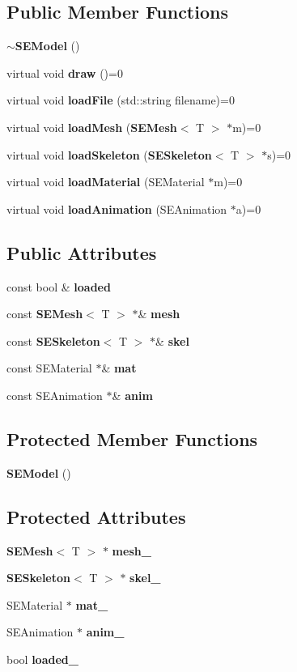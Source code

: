\subsection*{Public Member Functions}
\begin{DoxyCompactItemize}
\item 
{\bf $\sim$\+S\+E\+Model} ()
\item 
virtual void {\bf draw} ()=0
\item 
virtual void {\bf load\+File} (std\+::string filename)=0
\item 
virtual void {\bf load\+Mesh} ({\bf S\+E\+Mesh}$<$ T $>$ $\ast$m)=0
\item 
virtual void {\bf load\+Skeleton} ({\bf S\+E\+Skeleton}$<$ T $>$ $\ast$s)=0
\item 
virtual void {\bf load\+Material} (S\+E\+Material $\ast$m)=0
\item 
virtual void {\bf load\+Animation} (S\+E\+Animation $\ast$a)=0
\end{DoxyCompactItemize}
\subsection*{Public Attributes}
\begin{DoxyCompactItemize}
\item 
const bool \& {\bf loaded}
\item 
const {\bf S\+E\+Mesh}$<$ T $>$ $\ast$\& {\bf mesh}
\item 
const {\bf S\+E\+Skeleton}$<$ T $>$ $\ast$\& {\bf skel}
\item 
const S\+E\+Material $\ast$\& {\bf mat}
\item 
const S\+E\+Animation $\ast$\& {\bf anim}
\end{DoxyCompactItemize}
\subsection*{Protected Member Functions}
\begin{DoxyCompactItemize}
\item 
{\bf S\+E\+Model} ()
\end{DoxyCompactItemize}
\subsection*{Protected Attributes}
\begin{DoxyCompactItemize}
\item 
{\bf S\+E\+Mesh}$<$ T $>$ $\ast$ {\bf mesh\+\_\+}
\item 
{\bf S\+E\+Skeleton}$<$ T $>$ $\ast$ {\bf skel\+\_\+}
\item 
S\+E\+Material $\ast$ {\bf mat\+\_\+}
\item 
S\+E\+Animation $\ast$ {\bf anim\+\_\+}
\item 
bool {\bf loaded\+\_\+}
\end{DoxyCompactItemize}


